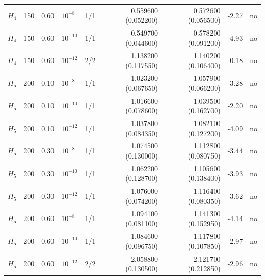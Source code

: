 \begin{longtable}{lrrlrrrrc}
$H_4$ & 150 & 0.60 & $10^{-8}$ & 1/1 & 0.559600 (0.052200) & 0.572600 (0.056500) & -2.27 & no\\
$H_4$ & 150 & 0.60 & $10^{-10}$ & 1/1 & 0.549700 (0.044600) & 0.578200 (0.091200) & -4.93 & no\\
$H_4$ & 150 & 0.60 & $10^{-12}$ & 2/2 & 1.138200 (0.117550) & 1.140200 (0.106400) & -0.18 & no\\
$H_5$ & 200 & 0.10 & $10^{-8}$ & 1/1 & 1.023200 (0.067650) & 1.057900 (0.066200) & -3.28 & no\\
$H_5$ & 200 & 0.10 & $10^{-10}$ & 1/1 & 1.016600 (0.078600) & 1.039500 (0.162700) & -2.20 & no\\
$H_5$ & 200 & 0.10 & $10^{-12}$ & 1/1 & 1.037800 (0.084350) & 1.082100 (0.127200) & -4.09 & no\\
$H_5$ & 200 & 0.30 & $10^{-8}$ & 1/1 & 1.074500 (0.130000) & 1.112800 (0.080750) & -3.44 & no\\
$H_5$ & 200 & 0.30 & $10^{-10}$ & 1/1 & 1.062200 (0.128700) & 1.105600 (0.138400) & -3.93 & no\\
$H_5$ & 200 & 0.30 & $10^{-12}$ & 1/1 & 1.076000 (0.074200) & 1.116400 (0.080350) & -3.62 & no\\
$H_5$ & 200 & 0.60 & $10^{-8}$ & 1/1 & 1.094100 (0.081100) & 1.141300 (0.152950) & -4.14 & no\\
$H_5$ & 200 & 0.60 & $10^{-10}$ & 1/1 & 1.084600 (0.096750) & 1.117800 (0.107850) & -2.97 & no\\
$H_5$ & 200 & 0.60 & $10^{-12}$ & 2/2 & 2.058800 (0.130500) & 2.121700 (0.212850) & -2.96 & no\\
\end{longtable}
\endgroup
